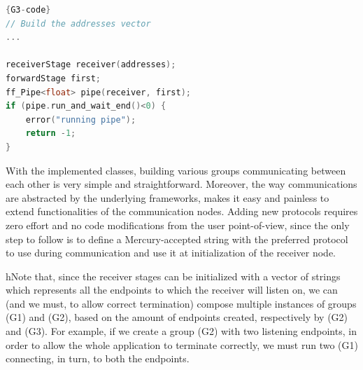 \begin{center}
\begin{minipage}{.63\textwidth}
\begin{lstlisting}[caption=G3 node composition,language=C++, style=mystyle, label=G3-node]{G3-code}
// Build the addresses vector
...

receiverStage receiver(addresses);
forwardStage first;
ff_Pipe<float> pipe(receiver, first);
if (pipe.run_and_wait_end()<0) {
    error("running pipe");
    return -1;
}
\end{lstlisting}
\end{minipage}
\end{center}

With the implemented classes, building various groups communicating between each other is very simple and straightforward. Moreover, the way communications are abstracted by the underlying frameworks, makes it easy and painless to extend functionalities of the communication nodes. Adding new protocols requires zero effort and no code modifications from the user point-of-view, since the only step to follow is to define a Mercury-accepted string with the preferred protocol to use during communication and use it at initialization of the receiver node.\newline

hNote that, since the receiver stages can be initialized with a vector of strings which represents all the endpoints to which the receiver will listen on, we can (and we must, to allow correct termination) compose multiple instances of groups (G1) and (G2), based on the amount of endpoints created, respectively by (G2) and (G3). For example, if we create a group (G2) with two listening endpoints, in order to allow the whole application to terminate correctly, we must run two (G1) connecting, in turn, to both the endpoints.